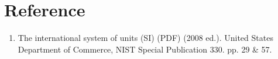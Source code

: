 \section{Reference}

\begin{enumerate}
\item  The international system of units (SI) (PDF) (2008 ed.). United States Department of Commerce, NIST Special Publication 330. pp. 29 \& 57.
\end{enumerate}